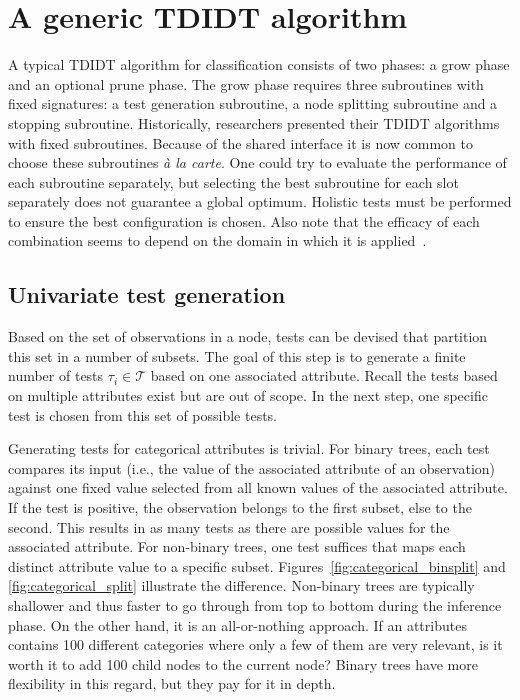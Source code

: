\section{A generic TDIDT algorithm}
A typical TDIDT algorithm for classification consists of two phases: a grow phase and an optional prune phase. The grow phase requires three subroutines with fixed signatures: a test generation subroutine, a node splitting subroutine and a stopping subroutine. Historically, researchers presented their TDIDT algorithms with fixed subroutines. Because of the shared interface it is now common to choose these subroutines \emph{\`{a} la carte}. One could try to evaluate the performance of each subroutine separately, but selecting the best subroutine for each slot separately does not guarantee a global optimum. Holistic tests must be performed to ensure the best configuration is chosen. Also note that the efficacy of each combination seems to depend on the domain in which it is applied~\cite{mingers1989empirical}.

\subsection{Univariate test generation}
Based on the set of observations in a node, tests can be devised that partition this set in a number of subsets. The goal of this step is to generate a finite number of tests $\tau_i \in \mathcal{T}$ based on one associated attribute. Recall the tests based on multiple attributes exist but are out of scope. In the next step, one specific test is chosen from this set of possible tests.

Generating tests for categorical attributes is trivial. For binary trees, each test compares its input (i.e., the value of the associated attribute of an observation) against one fixed value selected from all known values of the associated attribute. If the test is positive, the observation belongs to the first subset, else to the second. This results in as many tests as there are possible values for the associated attribute. For non-binary trees, one test suffices that maps each distinct attribute value to a specific subset. Figures~\ref{fig:categorical_binsplit} and \ref{fig:categorical_split} illustrate the difference. Non-binary trees are typically shallower and thus faster to go through from top to bottom during the inference phase. On the other hand, it is an all-or-nothing approach. If an attributes contains 100 different categories where only a few of them are very relevant, is it worth it to add 100 child nodes to the current node? Binary trees have more flexibility in this regard, but they pay for it in depth.

